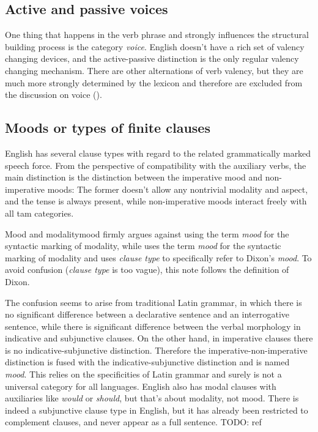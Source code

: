 \documentclass[UTF8, a4paper, oneside, scheme=plain]{ctexrep}
\newcommand*{\term}[1]{\emph{#1}}
\newcommand{\corpus}[1]{\emph{#1}}
\begin{document}
\subsection{Active and passive voices}

One thing that happens in the verb phrase 
and strongly influences the structural building process is the category \emph{voice}.
English doesn't have a rich set of valency changing devices,
and the active-passive distinction is the only regular valency changing mechanism.
There are other alternations of verb valency, 
but they are much more strongly determined by the lexicon 
and therefore are excluded from the discussion on voice ().

\subsection{Moods or types of finite clauses}\label{sec:moods}

English has several clause types with regard to the related grammatically marked speech force.
From the perspective of compatibility with the auxiliary verbs,
the main distinction is the distinction between the imperative mood and non-imperative moods:
The former doesn't allow any nontrivial modality and aspect,
and the tense is always present,
while non-imperative moods interact freely with all \acs{tam} categories.

\begin{infobox}{Mood and modality}{mood}
    \citet{dixon2009basic1} firmly argues against using the term \term{mood} 
    for the syntactic marking of modality,
    while \citet{cgel} uses the term \term{mood} for the syntactic marking of modality
    and uses \term{clause type} to specifically refer to Dixon's \term{mood}.
    To avoid confusion (\term{clause type} is too vague),
    this note follows the definition of Dixon.

    The confusion seems to arise from traditional Latin grammar,
    in which there is no significant difference 
    between a declarative sentence and an interrogative sentence, 
    while there is significant difference
    between the verbal morphology in indicative and subjunctive clauses.
    On the other hand, in imperative clauses 
    there is no indicative-subjunctive distinction.
    Therefore the imperative-non-imperative distinction is fused with 
    the indicative-subjunctive distinction 
    and is named \term{mood}.
    This relies on the specificities of Latin grammar 
    and surely is not a universal category for all languages.
    English also has modal clauses with auxiliaries like \corpus{would} or \corpus{should},
    but that's about modality, not mood.
    There is indeed a subjunctive clause type in English,
    but it has already been restricted to complement clauses,
    and never appear as a full sentence. TODO: ref
\end{infobox}
\end{document}
